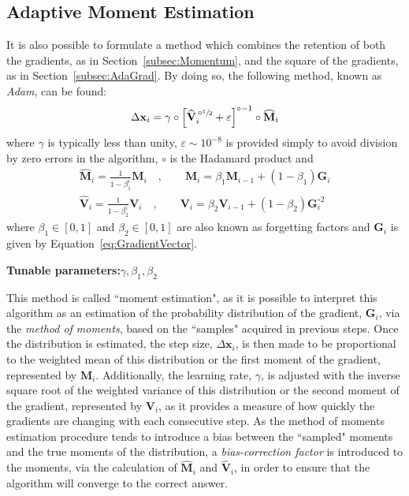 \documentclass{article}
\begin{document}
\subsection{Adaptive Moment Estimation}
\label{subsec:Adam}

It is also possible to formulate a method which combines the retention of both the gradients, as in Section~\ref{subsec:Momentum}, and the square of the gradients, as in Section~\ref{subsec:AdaGrad}. By doing so, the following method, known as \emph{Adam}, can be found:
\begin{equation}
\label{eq:SE_Adam}
	\Delta \mathbf{x}_i = \gamma \circ \left[\widehat{\mathbf{V}}_i^{\,\circ\sfrac{1}{2}} + \varepsilon\right]^{ \circ-1} \circ \widehat{\mathbf{M}}_i
\end{equation}
where $\gamma$ is typically less than unity, $\varepsilon \sim 10^{-8}$ is provided simply to avoid division by zero errors in the algorithm, $\circ$ is the Hadamard product and
\begin{equation}
\label{eq:NormalizedGradientMoments}
	\begin{gathered}
	\widehat{\mathbf{M}}_i = \frac{1}{1 - \beta_1^i} \mathbf{M}_i \quad, \qquad \mathbf{M}_i = \beta_1 \mathbf{M}_{i-1} + \left(1 - \beta_1\right) \mathbf{G}_i \\
	\widehat{\mathbf{V}}_i = \frac{1}{1 - \beta_2^i} \mathbf{V}_i \quad, \qquad \mathbf{V}_i = \beta_2 \mathbf{V}_{i-1} + \left(1 - \beta_2\right) \mathbf{G}_i^{\circ 2}
	\end{gathered}
\end{equation}
where $\beta_1 \in \left[0,1\right]$ and $\beta_2 \in \left[0,1\right]$ are also known as forgetting factors and $\mathbf{G}_i$ is given by Equation~\eqref{eq:GradientVector}.

\begin{center}
	\textbf{Tunable parameters:}\hspace{20pt}$\gamma,\beta_1,\beta_2$
\end{center}

This method is called ``moment estimation", as it is possible to interpret this algorithm as an estimation of the probability distribution of the gradient, $\mathbf{G}_i$, via the \emph{method of moments}, based on the ``samples" acquired in previous steps. Once the distribution is estimated, the step size, $\Delta \mathbf{x}_i$, is then made to be proportional to the weighted mean of this distribution or the first moment of the gradient, represented by $\mathbf{M}_i$. Additionally, the learning rate, $\gamma$, is adjusted with the inverse square root of the weighted variance of this distribution or the second moment of the gradient, represented by $\mathbf{V}_i$, as it provides a measure of how quickly the gradients are changing with each consecutive step. As the method of moments estimation procedure tends to introduce a bias between the ``sampled" moments and the true moments of the distribution, a \emph{bias-correction factor} is introduced to the moments, via the calculation of $\widehat{\mathbf{M}}_i$ and $\widehat{\mathbf{V}}_i$, in order to ensure that the algorithm will converge to the correct answer.
\end{document}

